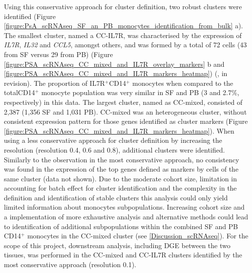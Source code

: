 Using this conservative approach for cluster definition, two robust clusters were identified (Figure \ref{figure:PsA_scRNAseq_SF_an_PB_monocytes_identification_from_bulk} a). The smallest cluster, named a CC-IL7R, was characterised by the expression of \textit{IL7R}, \textit{IL32} and \textit{CCL5}, amongst others, and was formed by a total of 72 cells (43 from SF versus 29 from PB) (Figure \ref{figure:PSA_scRNAseq_CC_mixed_and_IL7R_overlay_markers} b and \ref{figure:PSA_scRNAseq_CC_mixed_and_IL7R_markers_heatmap}) (\parencite{Al-Mossawi2018}, in revision). The proportion of IL7R$^+$CD14$^+$ monocytes when compared to the totalCD14$^+$ monocyte population was very similar in SF and PB (3 and 2.7\%, respectively) in this data. The largest cluster, named as CC-mixed, consisted of 2,387 (1,356 SF and 1,031 PB). CC-mixed was an heterogeneous cluster, without consistent expression pattern for those genes identified as cluster markers (Figure \ref{figure:PSA_scRNAseq_CC_mixed_and_IL7R_markers_heatmap}). When using a less conservative approach for cluster definition by increasing the resolution (resolution 0.4, 0.6 and 0.8), additional clusters were identified. Similarly to the observation in the most conservative approach, no consistency was found in the expression of the top genes defined as markers by cells of the same cluster (data not shown). Due to the moderate cohort size, limitation in accounting for batch effect for cluster identification and the complexity in the definition and identification of stable clusters this analysis could only yield limited information about monocytes subpopulations.  Increasing cohort size and a implementation of more exhaustive analysis and alternative methods could lead to identification of additional subpopulations within the combined SF and PB CD14$^+$ monocytes in the CC-mixed cluster (see \ref{Discussion_scRNAseq}). For the scope of this project, downstream analysis, including DGE between the two tissues, was performed in the CC-mixed and CC-IL7R clusters identified by the most conservative approach (resolution 0.1).




